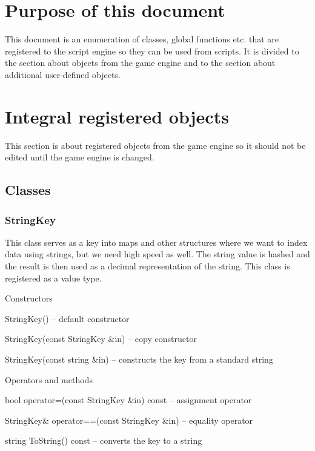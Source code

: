 \section{Purpose of this document}

This document is an enumeration of classes, global functions etc. that are registered to the script engine so they can be used from scripts. It is divided to the section about objects from the game engine and to the section about additional user-defined objects.

\section{Integral registered objects}

This section is about registered objects from the game engine so it should not be edited until the game engine is changed.

\subsection{Classes}

\subsubsection{StringKey}

This class serves as a key into maps and other structures where we want to index data using strings, but we need high speed as well. The string value is hashed and the result is then used as a decimal representation of the string. This class is registered as a value type.

\begin{titled-itemize}{Constructors}
	\item StringKey() -- default constructor
	\item StringKey(const StringKey \&in) -- copy constructor
	\item StringKey(const string \&in) -- constructs the key from a standard string
\end{titled-itemize}

\begin{titled-itemize}{Operators and methods}
  \item bool operator=(const StringKey \&in) const -- assignment operator
  \item StringKey\& operator==(const StringKey \&in) -- equality operator
  \item string ToString() const -- converts the key to a string
\end{titled-itemize}

